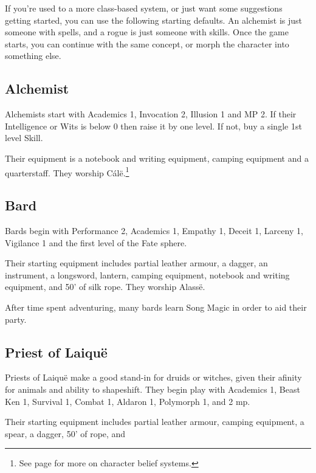 \begin{multicols}{2}

If you're used to a more class-based system, or just want some suggestions getting started, you can use the following starting defaults.
An alchemist is just someone with spells, and a rogue is just someone with skills.
Once the game starts, you can continue with the same concept, or morph the character into something else.

\subsection{Alchemist}

Alchemists start with Academics 1, Invocation 2, Illusion 1 and MP 2.
If their Intelligence or Wits is below 0 then raise it by one level.
If not, buy a single 1st level Skill.

Their equipment is a notebook and writing equipment, camping equipment and a quarterstaff.
They worship C\'{a}l\"{e}.\footnote{See page \pageref{gods_codes} for more on character belief systems.}

\subsection{Bard}

Bards begin with Performance 2, Academics 1, Empathy 1, Deceit 1, Larceny 1, Vigilance 1 and the first level of the Fate sphere.

Their starting equipment includes partial leather armour, a dagger, an instrument, a longsword, lantern, camping equipment, notebook and writing equipment, and 50' of silk rope.
They worship Alass\"{e}.

After time spent adventuring, many bards learn Song Magic in order to aid their party.

\subsection{Priest of Laiqu\"{e}}

Priests of Laiqu\"{e} make a good stand-in for druids or witches, given their afinity for animals and ability to shapeshift.
They begin play with Academics 1, Beast Ken 1, Survival 1, Combat 1, Aldaron 1, Polymorph 1, and 2 \gls{mp}.

Their starting equipment includes partial leather armour, camping equipment, a spear, a dagger, 50' of rope, and 



\end{multicols}
